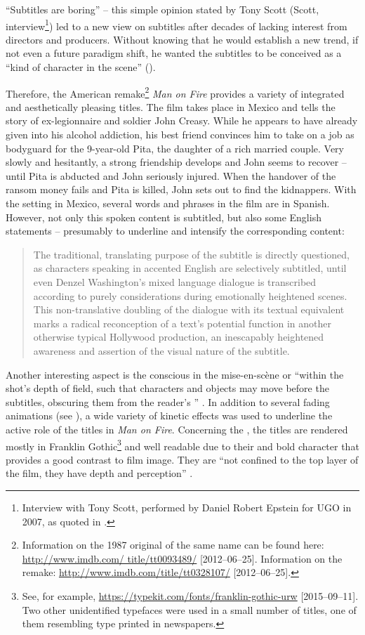  “Subtitles are boring” – this simple opinion stated by Tony Scott (Scott, interview\footnote{Interview with Tony Scott, performed by Daniel Robert Epstein for UGO in 2007, as quoted in \citet{Kofoed2011}.}) led to a new view on subtitles after decades of lacking interest from directors and producers. Without knowing that he would establish a new trend, if not even a future paradigm shift, he wanted the subtitles to be conceived as a “kind of character in the scene” (\citealt{Kofoed2011}).

Therefore, the American remake\footnote{Information on the 1987 original of the same name can be found here: \url{http://www.imdb.com/ title/tt0093489/} [2012--06--25]. Information on the remake: \url{http://www.imdb.com/title/tt0328107/} [2012--06--25].} \textit{Man on Fire} provides a variety of integrated and aesthetically pleasing titles. The film takes place in Mexico and tells the story of ex-legionnaire and soldier John Creasy. While he appears to have already given into his alcohol addiction, his best friend convinces him to take on a job as bodyguard for the 9-year-old Pita, the daughter of a rich married couple. Very slowly and hesitantly, a strong friendship develops and John seems to recover – until Pita is abducted and John seriously injured. When the handover of the ransom money fails and Pita is killed, John sets out to find the kidnappers. With the setting in Mexico, several words and phrases in the film are in Spanish. However, not only this spoken content is subtitled, but also some English statements – presumably to underline and intensify the corresponding content:
\begin{quote}
The traditional, translating purpose of the subtitle is directly questioned, as characters speaking in accented English are selectively subtitled, until even Denzel Washington’s mixed language dialogue is transcribed according to purely  considerations during emotionally heightened scenes. This non-translative doubling of the dialogue with its textual equivalent marks a radical reconception of a text’s potential function in another otherwise typical Hollywood production, an inescapably heightened awareness and assertion of the visual nature of the subtitle. \citep{Kofoed2011}
\end{quote}

Another interesting aspect is the conscious  in the mise-en-scène or “within the shot’s depth of field, such that characters and objects may move before the subtitles, obscuring them from the reader’s ” \citep{Kofoed2011}. In addition to several fading animations (see ), a wide variety of kinetic effects was used to underline the active role of the titles in \textit{Man on Fire}. Concerning the , the titles are rendered mostly in Franklin Gothic\footnote{See, for example, \url{https://typekit.com/fonts/franklin-gothic-urw} [2015--09--11]. Two other unidentified typefaces were used in a small number of titles, one of them resembling type printed in newspapers.} and well readable due to their  and bold character that provides a good contrast to film image. They are “not confined to the top layer of the film, they have depth and perception” \citep{Vit2005}.

